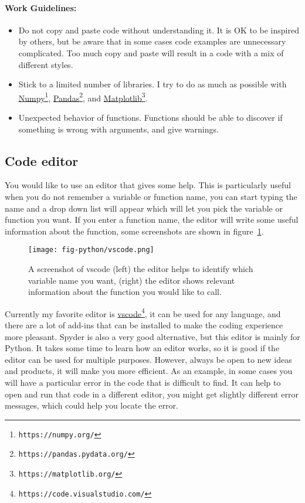 \documentclass[graybox,sectrefs,envcountresetchap,open=right,final]{svmonodo}
\begin{document}
\noindent
\paragraph{Work Guidelines:}
\begin{itemize}
\item Do not copy and paste code without understanding it. It is OK to be inspired by others, but be aware that in some cases code examples are unnecessary complicated. Too much copy and paste will result in a code with a mix of different styles. 

\item Stick to a limited number of libraries. I try to do as much as possible with \href{{https://numpy.org/}}{Numpy}\footnote{\texttt{https://numpy.org/}}, \href{{https://pandas.pydata.org/}}{Pandas}\footnote{\texttt{https://pandas.pydata.org/}}, and  \href{{https://matplotlib.org/}}{Matplotlib}\footnote{\texttt{https://matplotlib.org/}}.

\item Unexpected behavior of functions. Functions should be able to discover if something is wrong with arguments, and give warnings.
\end{itemize}

\noindent
\subsection{Code editor}
You would like to use an editor that gives some help. This is particularly useful when you do not remember a variable or function name, you can start typing the name and a drop down list will appear which will let you pick the variable or function you want. If you enter  a function name, the editor will write some useful information about the function, some screenshots are shown in figure~\ref{fig:py:vscode}.

\begin{figure}[!ht]  %
  \centerline{\texttt{[image: fig-python/vscode.png]}}
  \caption{
  A screenshot of vscode (left) the editor helps to identify which variable name you want, (right) the editor shows relevant information about the function you would like to call. \label{fig:py:vscode}
  }
\end{figure}

Currently my favorite editor is \href{{https://code.visualstudio.com/}}{vscode}\footnote{\texttt{https://code.visualstudio.com/}}, it can be used for any language, and there are a lot of add-ins that can be installed to make the coding experience more pleasant. Spyder is also a very good alternative, but this editor is mainly for Python. It takes some time to learn how an editor works, so it is good if the editor can be used for multiple purposes.  However, always be open to new ideas and products, it will make you more efficient. As an example, in some cases you will have a particular error in the code that is difficult to find. It can help to open and run that code in a different editor, you might get slightly different error messages, which could help you locate the error.
\end{document}
